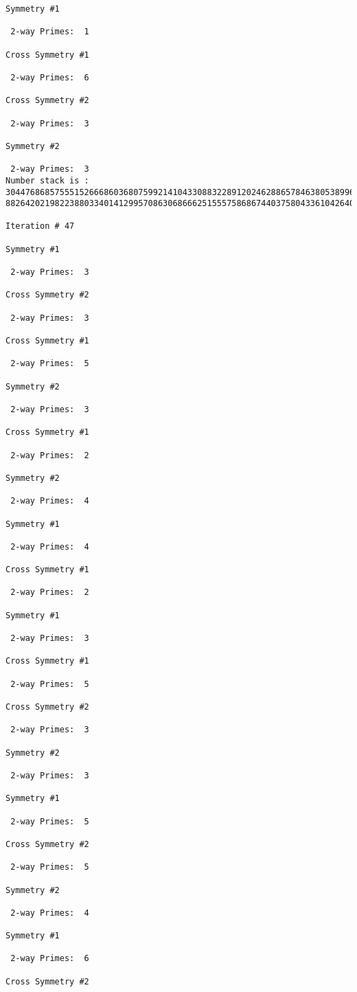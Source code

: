 \begin{verbatim}
Symmetry #1

 2-way Primes: 	1

Cross Symmetry #1

 2-way Primes: 	6

Cross Symmetry #2

 2-way Primes: 	3

Symmetry #2

 2-way Primes: 	3
Number stack is :
30447686857555152666860368075992141043308832289120246288657846380538996794608835958544046240163340857
88264202198223880334014129957086306866625155575868674403758043361042640445859538806497699835083648756

Iteration #	47

Symmetry #1

 2-way Primes: 	3

Cross Symmetry #2

 2-way Primes: 	3

Cross Symmetry #1

 2-way Primes: 	5

Symmetry #2

 2-way Primes: 	3

Cross Symmetry #1

 2-way Primes: 	2

Symmetry #2

 2-way Primes: 	4

Symmetry #1

 2-way Primes: 	4

Cross Symmetry #1

 2-way Primes: 	2

Symmetry #1

 2-way Primes: 	3

Cross Symmetry #1

 2-way Primes: 	5

Cross Symmetry #2

 2-way Primes: 	3

Symmetry #2

 2-way Primes: 	3

Symmetry #1

 2-way Primes: 	5

Cross Symmetry #2

 2-way Primes: 	5

Symmetry #2

 2-way Primes: 	4

Symmetry #1

 2-way Primes: 	6

Cross Symmetry #2


\end{verbatim}

